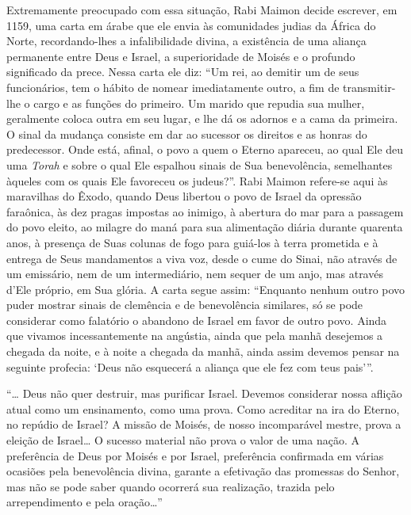Extremamente preocupado com essa situação, Rabi Maimon decide escrever,
em 1159, uma carta em árabe que ele envia às comunidades judias da
África do Norte, recordando-lhes a infalibilidade divina, a existência
de uma aliança permanente entre Deus e Israel, a superioridade de Moisés
e o profundo significado da prece. Nessa carta ele diz: ``Um rei, ao
demitir um de seus funcionários, tem o hábito de nomear imediatamente
outro, a fim de transmitir-lhe o cargo e as funções do primeiro. Um
marido que repudia sua mulher, geralmente coloca outra em seu lugar, e
lhe dá os adornos e a cama da primeira. O sinal da mudança consiste em
dar ao sucessor os direitos e as honras do predecessor. Onde está,
afinal, o povo a quem o Eterno apareceu, ao qual Ele deu uma
\emph{Torah} e sobre o qual Ele espalhou sinais de Sua benevolência,
semelhantes àqueles com os quais Ele favoreceu os judeus?''. Rabi
Maimon refere-se aqui às maravilhas do Êxodo, quando Deus libertou o
povo de Israel da opressão faraônica, às dez pragas impostas ao inimigo,
à abertura do mar para a passagem do povo eleito, ao milagre do maná
para sua alimentação diária durante quarenta anos, à presença de Suas
colunas de fogo para guiá-los à terra prometida e à entrega de Seus
mandamentos a viva voz, desde o cume do Sinai, não através de um
emissário, nem de um intermediário, nem sequer de um anjo, mas através
d'Ele próprio, em Sua glória. A carta segue assim: ``Enquanto nenhum
outro povo puder mostrar sinais de clemência e de benevolência
similares, só se pode considerar como falatório o abandono de Israel em
favor de outro povo. Ainda que vivamos incessantemente na angústia,
ainda que pela manhã desejemos a chegada da noite, e à noite a chegada
da manhã, ainda assim devemos pensar na seguinte profecia: `Deus não
esquecerá a aliança que ele fez com teus pais'''.

``\ldots{} Deus não quer destruir, mas purificar Israel. Devemos considerar
nossa aflição atual como um ensinamento, como uma prova. Como acreditar
na ira do Eterno, no repúdio de Israel? A missão de Moisés, de nosso
incomparável mestre, prova a eleição de Israel\ldots{} O sucesso material
não prova o valor de uma nação. A preferência de Deus por Moisés e por
Israel, preferência confirmada em várias ocasiões pela benevolência
divina, garante a efetivação das promessas do Senhor, mas não se pode
saber quando ocorrerá sua realização, trazida pelo arrependimento e
pela oração\ldots{}''

